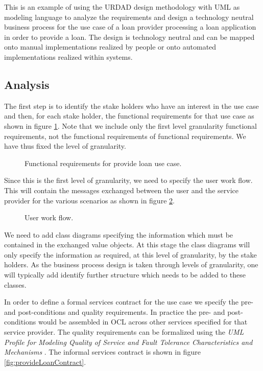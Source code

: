 \documentclass[reviewcopy]{elsart}
\begin{document}
This is an example of using the URDAD design methodology with UML as modeling
language to analyze the requirements and design a technology neutral business
process for the use case of a loan provider processing a loan application in order
to provide a loan. The design is technology neutral and can be mapped onto manual
implementations realized by people or onto automated implementations realized
within systems.


\subsection{Analysis}

The first step is to identify the stake holders who have an interest in the use
case and then, for each stake holder, the functional requirements for that use case
as shown in figure \ref{fig:provideLoanFunctionalRequirements}. Note that we include
only the first level granularity functional requirements, not the functional requirements
of functional requirements. We have thus fixed the level of granularity.

\begin{figure}
  \centering
  \caption{Functional requirements for provide loan use case.}
  \label{fig:provideLoanFunctionalRequirements}
\end{figure}

Since this is the first level of granularity, we need to specify the user work
flow. This will contain the messages exchanged between the user and the
service provider for the various scenarios as shown in figure
\ref{fig:provideLoanUserWorkflow}.

\begin{figure}
  \centering
  \caption{User work flow.}
  \label{fig:provideLoanUserWorkflow}
\end{figure}

We need to add class diagrams specifying the information which must be
contained in the exchanged value objects. At this stage the class diagrams
will only specify the information as required, at this level of granularity,
 by the stake holders. As the
business process design is taken through levels of granularity, one will
typically add identify further structure which needs to be added to these classes.

In order to define a formal services contract for the use case we specify the
pre- and post-conditions and quality requirements. In practice the pre- and
post-conditions would be assembled in OCL across other services specified
for that service provider. The quality requirements can be formalized using the
{\em UML Profile for Modeling Quality of Service and Fault Tolerance Characteristics
and Mechanisms} \cite{omg:umlProfileQos}. The informal services contract is shown
in figure \ref{fig:provideLoanContract}.
\end{document}
